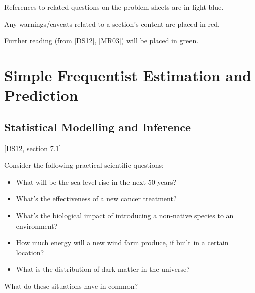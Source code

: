 \documentclass[a4paper]{article}
\begin{document}
        \begin{relq}
            References to related questions on the problem sheets are in light
            blue.
        \end{relq}

        \begin{warn}
            Any warnings/caveats related to a section's content are placed in
            red.
        \end{warn}

        \begin{fread}
            Further reading (from [DS12], [MR03]) will be placed in green.
        \end{fread}

    \newpage
    \section{Simple Frequentist Estimation and Prediction}
        \subsection{Statistical Modelling and Inference}
            \begin{fread}
                [MR03, section 7.1]

                [DS12, section 7.1]
            \end{fread}

            Consider the following practical scientific questions:

            \begin{itemize}
                \item What will be the sea level rise in the next 50 years?
                \item What's the effectiveness of a new cancer treatment?
                \item What's the biological impact of introducing a non-native
                    species to an environment?
                \item How much energy will a new wind farm produce, if built in
                    a certain location?
                \item What is the distribution of dark matter in the universe?
            \end{itemize}

            What do these situations have in common?
\end{document}

